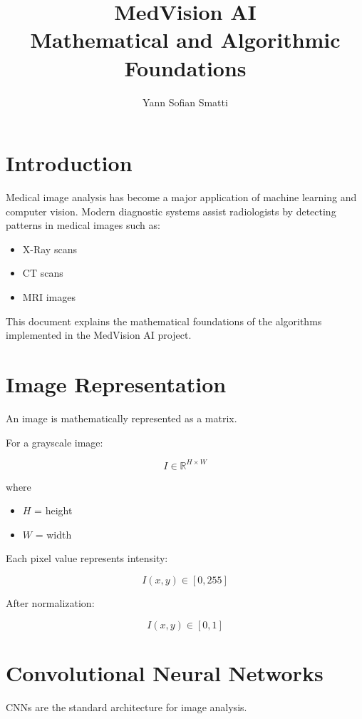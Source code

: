﻿\documentclass[11pt]{article}
\title{MedVision AI \\ Mathematical and Algorithmic Foundations}
\author{Yann Sofian Smatti}
\date{}
\begin{document}
\maketitle

\tableofcontents

\newpage

\section{Introduction}

Medical image analysis has become a major application of machine learning and computer vision. 
Modern diagnostic systems assist radiologists by detecting patterns in medical images such as:

\begin{itemize}
\item X-Ray scans
\item CT scans
\item MRI images
\end{itemize}

This document explains the mathematical foundations of the algorithms implemented in the MedVision AI project.

\section{Image Representation}

An image is mathematically represented as a matrix.

For a grayscale image:

\[
I \in \mathbb{R}^{H \times W}
\]

where

\begin{itemize}
\item $H$ = height
\item $W$ = width
\end{itemize}

Each pixel value represents intensity:

\[
I(x,y) \in [0,255]
\]

After normalization:

\[
I(x,y) \in [0,1]
\]

\section{Convolutional Neural Networks}

CNNs are the standard architecture for image analysis.
\end{document}
